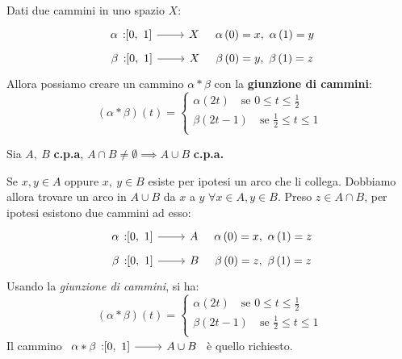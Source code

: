\begin{define}
	Dati due cammini in uno spazio $X$:
	\begin{gather*}
		\funz{\alpha}{\left[0,\ 1\right]}{X}\quad \alpha\left(0\right)=x,\ \alpha\left(1\right)=y\\
		\funz{\beta}{\left[0,\ 1\right]}{X}\quad \beta\left(0\right)=y,\ \beta\left(1\right)=z
	\end{gather*}
	Allora possiamo creare un cammino $\alpha \ast \beta$ con la \textbf{giunzione di cammini}:
	\begin{equation}
		\left(\alpha\ast\beta\right)\left(t\right)=\begin{cases}
			\alpha\left(2t\right)\quad\text{se }0\leq t\leq \frac{1}{2}\\
			\beta\left(2t-1\right)\quad\text{se }\frac{1}{2}\leq t\leq 1\\	
		\end{cases}
	\end{equation}
\vspace{-6mm}
\end{define}
\begin{lemming}
	Sia $A,\ B$ \textbf{c.p.a}, $A\cap B\neq \emptyset\implies A\cup B$ \textbf{c.p.a.}
\end{lemming}
\begin{demonstration}
	Se $x, y\in A$ oppure $x,\ y\in B$ esiste per ipotesi un arco che li collega. Dobbiamo allora trovare un arco in $A\cup B$ da $x$ a $y$ $\forall x\in A, y\in B$. Preso $z\in A\cap B$, per ipotesi esistono due cammini ad esso:
	\begin{gather*}
		\funz{\alpha}{\left[0,\ 1\right]}{A}\quad \alpha\left(0\right)=x,\ \alpha\left(1\right)=z\\
		\funz{\beta}{\left[0,\ 1\right]}{B}\quad \beta\left(0\right)=z,\ \beta\left(1\right)=z	
	\end{gather*}
	Usando la \textit{giunzione di cammini}, si ha:
	\begin{equation}
		\left(\alpha\ast\beta\right)\left(t\right)=\begin{cases}
			\alpha\left(2t\right)\quad\text{se }0\leq t\leq \frac{1}{2}\\
			\beta\left(2t-1\right)\quad\text{se }\frac{1}{2}\leq t\leq 1\\	
		\end{cases}
	\end{equation}
	Il cammino $\funz{\alpha\ast\beta}{\left[0,\ 1\right]}{A\cup B}$ è quello richiesto.
\end{demonstration}
